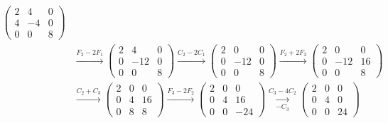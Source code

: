 \begin{ejemplo}
\begin{align*}
        \left(\begin{array}{ccc}
            2 & 4 & 0 \\
            4 & -4 & 0 \\
            0 & 0 & 8
        \end{array}\right) \\
        &\xrightarrow{F_2-2F_1}
        \left(\begin{array}{ccc}
            2 & 4 & 0 \\
            0 & -12 & 0 \\
            0 & 0 & 8
        \end{array}\right) 
        \xrightarrow{C_2-2C_1}
        \left(\begin{array}{ccc}
            2 & 0 & 0 \\
            0 & -12 & 0 \\
            0 & 0 & 8
        \end{array}\right) 
        \xrightarrow{F_2+2F_3}
        \left(\begin{array}{ccc}
            2 & 0 & 0 \\
            0 & -12 & 16 \\
            0 & 0 & 8
        \end{array}\right)  \\
        &\xrightarrow{C_2+C_3}
        \left(\begin{array}{ccc}
            2 & 0 & 0 \\
            0 & 4 & 16 \\
            0 & 8 & 8
        \end{array}\right)  
        \xrightarrow{F_3-2F_2}
        \left(\begin{array}{ccc}
            2 & 0 & 0 \\
            0 & 4 & 16 \\
            0 & 0 & -24
        \end{array}\right)  
        \underset{-C_3}{\xrightarrow{C_3-4C_2}}
        \left(\begin{array}{ccc}
            2 & 0 & 0 \\
            0 & 4 & 0 \\
            0 & 0 & 24
        \end{array}\right)  
    \end{align*}
\end{ejemplo}

